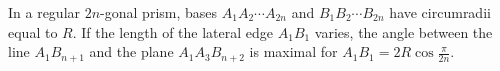 In a regular $2n$-gonal prism, bases $A_1A_2\cdots A_{2n}$ and $B_1B_2\cdots B_{2n}$ have circumradii equal to $R$. If the length of the lateral edge $A_1B_1$ varies, the angle between the line $A_1B_{n+1}$ and the plane $A_1A_3B_{n+2}$ is maximal for $A_1B_1=2R\cos\frac\pi{2n}$.
